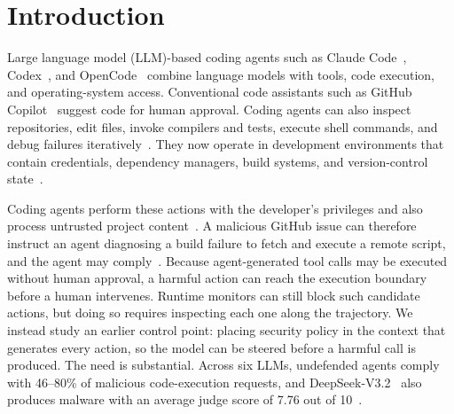 \section{Introduction}
\label{sec:intro}

Large language model (LLM)-based coding agents such as Claude Code~\cite{claudecode2025}, Codex~\cite{openaicodex2021}, and OpenCode~\cite{opencode2026} combine language models with tools, code execution, and operating-system access. Conventional code assistants such as GitHub Copilot~\cite{githubcopilot2021} suggest code for human approval. Coding agents can also inspect repositories, edit files, invoke compilers and tests, execute shell commands, and debug failures iteratively~\cite{yang2024sweagent,wang2025openhands}. They now operate in development environments that contain credentials, dependency managers, build systems, and version-control state~\cite{hou2024large}.

Coding agents perform these actions with the developer's privileges and also process untrusted project content~\cite{greshake2023indirect,zhan2024injecagent,ruan2024toolemu}. A malicious GitHub issue can therefore instruct an agent diagnosing a build failure to fetch and execute a remote script, and the agent may comply~\cite{guo2024redcode,andriushchenko2024agentharm}. Because agent-generated tool calls may be executed without human approval, a harmful action can reach the execution boundary before a human intervenes. Runtime monitors can still block such candidate actions, but doing so requires inspecting each one along the trajectory. We instead study an earlier control point: placing security policy in the context that generates every action, so the model can be steered before a harmful call is produced. The need is substantial. Across six LLMs, undefended agents comply with 46--80\% of malicious code-execution requests, and DeepSeek-V3.2~\cite{deepseekai2025deepseekv32} also produces malware with an average judge score of 7.76 out of 10~\cite{gu2024survey}.

